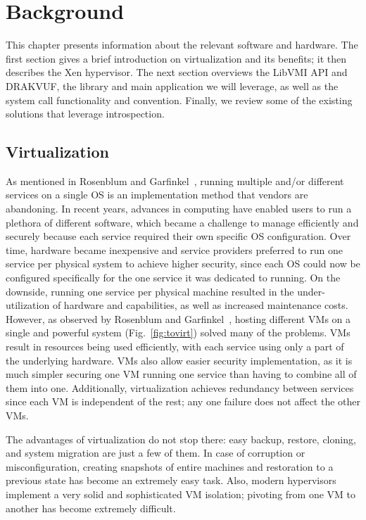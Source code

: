 \chapter{Background}\label{ch:background}

This chapter presents information about the relevant software and hardware. The first section gives a brief introduction on virtualization and its benefits; it then describes the Xen hypervisor. The next section overviews the LibVMI \ac{API} and DRAKVUF, the library and main application we will leverage, as well as the system call functionality and convention. Finally, we review some of the existing solutions that leverage introspection.

\section{Virtualization}\label{sec:virtualization}
As mentioned in Rosenblum and Garfinkel~\cite{rosenblum2005virtual}, running multiple and/or different services on a single \ac{OS} is an implementation method that vendors are abandoning. In recent years, advances in computing have enabled users to run a plethora of different software, which became a challenge to manage efficiently and securely because each service required their own specific \ac{OS} configuration. Over time, hardware became inexpensive and service providers preferred to run one service per physical system to achieve higher security, since each \ac{OS} could now be configured specifically for the one service it was dedicated to running. On the downside, running one service per physical machine resulted in the under-utilization of hardware and capabilities, as well as increased maintenance costs. However, as observed by Rosenblum and Garfinkel~\cite{rosenblum2005virtual}, hosting different \ac{VM}s on a single and powerful system (Fig.~\ref{fig:tovirt}) solved many of the problems. \ac{VM}s result in resources being used efficiently, with each service using only a part of the underlying hardware. \acp{VM} also allow easier security implementation, as it is much simpler securing one \ac{VM} running one service than having to combine all of them into one. Additionally, virtualization achieves redundancy between services since each \ac{VM} is independent of the rest; any one failure does not affect the other \ac{VM}s.

\par The advantages of virtualization do not stop there: easy backup, restore, cloning, and system migration are just a few of them. In case of corruption or misconfiguration, creating snapshots of entire machines and restoration to a previous state has become an extremely easy task. Also, modern hypervisors implement a very solid and sophisticated \ac{VM} isolation; pivoting from one \ac{VM} to another has become extremely difficult.

